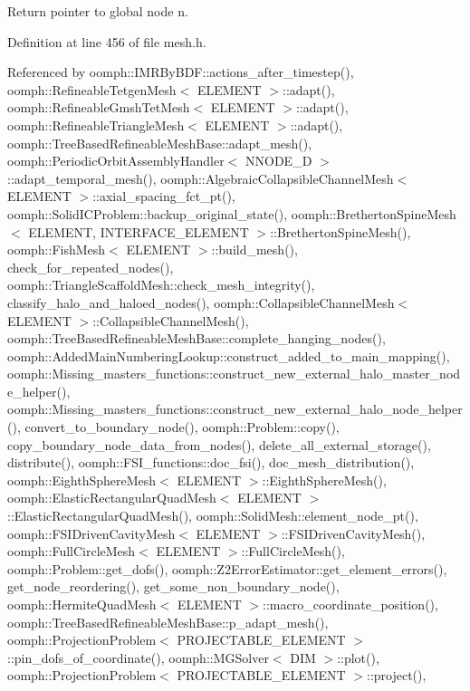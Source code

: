 Return pointer to global node n. 



Definition at line 456 of file mesh.\+h.



Referenced by oomph\+::\+I\+M\+R\+By\+B\+D\+F\+::actions\+\_\+after\+\_\+timestep(), oomph\+::\+Refineable\+Tetgen\+Mesh$<$ E\+L\+E\+M\+E\+N\+T $>$\+::adapt(), oomph\+::\+Refineable\+Gmsh\+Tet\+Mesh$<$ E\+L\+E\+M\+E\+N\+T $>$\+::adapt(), oomph\+::\+Refineable\+Triangle\+Mesh$<$ E\+L\+E\+M\+E\+N\+T $>$\+::adapt(), oomph\+::\+Tree\+Based\+Refineable\+Mesh\+Base\+::adapt\+\_\+mesh(), oomph\+::\+Periodic\+Orbit\+Assembly\+Handler$<$ N\+N\+O\+D\+E\+\_\+D $>$\+::adapt\+\_\+temporal\+\_\+mesh(), oomph\+::\+Algebraic\+Collapsible\+Channel\+Mesh$<$ E\+L\+E\+M\+E\+N\+T $>$\+::axial\+\_\+spacing\+\_\+fct\+\_\+pt(), oomph\+::\+Solid\+I\+C\+Problem\+::backup\+\_\+original\+\_\+state(), oomph\+::\+Bretherton\+Spine\+Mesh$<$ E\+L\+E\+M\+E\+N\+T, I\+N\+T\+E\+R\+F\+A\+C\+E\+\_\+\+E\+L\+E\+M\+E\+N\+T $>$\+::\+Bretherton\+Spine\+Mesh(), oomph\+::\+Fish\+Mesh$<$ E\+L\+E\+M\+E\+N\+T $>$\+::build\+\_\+mesh(), check\+\_\+for\+\_\+repeated\+\_\+nodes(), oomph\+::\+Triangle\+Scaffold\+Mesh\+::check\+\_\+mesh\+\_\+integrity(), classify\+\_\+halo\+\_\+and\+\_\+haloed\+\_\+nodes(), oomph\+::\+Collapsible\+Channel\+Mesh$<$ E\+L\+E\+M\+E\+N\+T $>$\+::\+Collapsible\+Channel\+Mesh(), oomph\+::\+Tree\+Based\+Refineable\+Mesh\+Base\+::complete\+\_\+hanging\+\_\+nodes(), oomph\+::\+Added\+Main\+Numbering\+Lookup\+::construct\+\_\+added\+\_\+to\+\_\+main\+\_\+mapping(), oomph\+::\+Missing\+\_\+masters\+\_\+functions\+::construct\+\_\+new\+\_\+external\+\_\+halo\+\_\+master\+\_\+node\+\_\+helper(), oomph\+::\+Missing\+\_\+masters\+\_\+functions\+::construct\+\_\+new\+\_\+external\+\_\+halo\+\_\+node\+\_\+helper(), convert\+\_\+to\+\_\+boundary\+\_\+node(), oomph\+::\+Problem\+::copy(), copy\+\_\+boundary\+\_\+node\+\_\+data\+\_\+from\+\_\+nodes(), delete\+\_\+all\+\_\+external\+\_\+storage(), distribute(), oomph\+::\+F\+S\+I\+\_\+functions\+::doc\+\_\+fsi(), doc\+\_\+mesh\+\_\+distribution(), oomph\+::\+Eighth\+Sphere\+Mesh$<$ E\+L\+E\+M\+E\+N\+T $>$\+::\+Eighth\+Sphere\+Mesh(), oomph\+::\+Elastic\+Rectangular\+Quad\+Mesh$<$ E\+L\+E\+M\+E\+N\+T $>$\+::\+Elastic\+Rectangular\+Quad\+Mesh(), oomph\+::\+Solid\+Mesh\+::element\+\_\+node\+\_\+pt(), oomph\+::\+F\+S\+I\+Driven\+Cavity\+Mesh$<$ E\+L\+E\+M\+E\+N\+T $>$\+::\+F\+S\+I\+Driven\+Cavity\+Mesh(), oomph\+::\+Full\+Circle\+Mesh$<$ E\+L\+E\+M\+E\+N\+T $>$\+::\+Full\+Circle\+Mesh(), oomph\+::\+Problem\+::get\+\_\+dofs(), oomph\+::\+Z2\+Error\+Estimator\+::get\+\_\+element\+\_\+errors(), get\+\_\+node\+\_\+reordering(), get\+\_\+some\+\_\+non\+\_\+boundary\+\_\+node(), oomph\+::\+Hermite\+Quad\+Mesh$<$ E\+L\+E\+M\+E\+N\+T $>$\+::macro\+\_\+coordinate\+\_\+position(), oomph\+::\+Tree\+Based\+Refineable\+Mesh\+Base\+::p\+\_\+adapt\+\_\+mesh(), oomph\+::\+Projection\+Problem$<$ P\+R\+O\+J\+E\+C\+T\+A\+B\+L\+E\+\_\+\+E\+L\+E\+M\+E\+N\+T $>$\+::pin\+\_\+dofs\+\_\+of\+\_\+coordinate(), oomph\+::\+M\+G\+Solver$<$ D\+I\+M $>$\+::plot(), oomph\+::\+Projection\+Problem$<$ P\+R\+O\+J\+E\+C\+T\+A\+B\+L\+E\+\_\+\+E\+L\+E\+M\+E\+N\+T $>$\+::project(), 